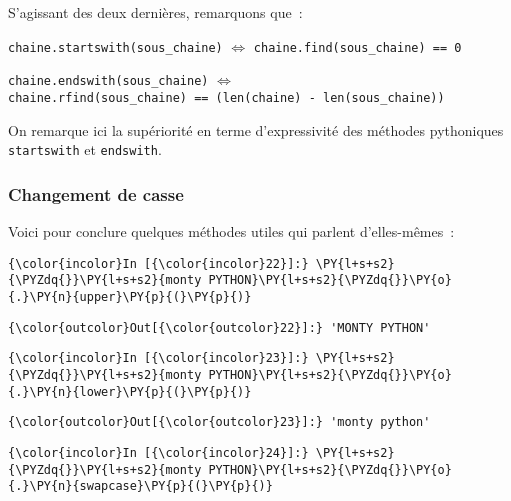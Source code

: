     S'agissant des deux dernières, remarquons que~:

    \texttt{chaine.startswith(sous\_chaine)} \(\Longleftrightarrow\)
\texttt{chaine.find(sous\_chaine)\ ==\ 0}

\texttt{chaine.endswith(sous\_chaine)} \(\Longleftrightarrow\)
\texttt{chaine.rfind(sous\_chaine)\ ==\ (len(chaine)\ -\ len(sous\_chaine))}

    On remarque ici la supériorité en terme d'expressivité des méthodes
pythoniques \texttt{startswith} et \texttt{endswith}.

    \hypertarget{changement-de-casse}{%
\subsubsection{Changement de casse}\label{changement-de-casse}}

    Voici pour conclure quelques méthodes utiles qui parlent d'elles-mêmes~:

    \begin{Verbatim}[commandchars=\\\{\},frame=single,framerule=0.3mm,rulecolor=\color{cellframecolor}]
{\color{incolor}In [{\color{incolor}22}]:} \PY{l+s+s2}{\PYZdq{}}\PY{l+s+s2}{monty PYTHON}\PY{l+s+s2}{\PYZdq{}}\PY{o}{.}\PY{n}{upper}\PY{p}{(}\PY{p}{)}
\end{Verbatim}


\begin{Verbatim}[commandchars=\\\{\},frame=single,framerule=0.3mm,rulecolor=\color{cellframecolor}]
{\color{outcolor}Out[{\color{outcolor}22}]:} 'MONTY PYTHON'
\end{Verbatim}
            
    \begin{Verbatim}[commandchars=\\\{\},frame=single,framerule=0.3mm,rulecolor=\color{cellframecolor}]
{\color{incolor}In [{\color{incolor}23}]:} \PY{l+s+s2}{\PYZdq{}}\PY{l+s+s2}{monty PYTHON}\PY{l+s+s2}{\PYZdq{}}\PY{o}{.}\PY{n}{lower}\PY{p}{(}\PY{p}{)}
\end{Verbatim}


\begin{Verbatim}[commandchars=\\\{\},frame=single,framerule=0.3mm,rulecolor=\color{cellframecolor}]
{\color{outcolor}Out[{\color{outcolor}23}]:} 'monty python'
\end{Verbatim}
            
    \begin{Verbatim}[commandchars=\\\{\},frame=single,framerule=0.3mm,rulecolor=\color{cellframecolor}]
{\color{incolor}In [{\color{incolor}24}]:} \PY{l+s+s2}{\PYZdq{}}\PY{l+s+s2}{monty PYTHON}\PY{l+s+s2}{\PYZdq{}}\PY{o}{.}\PY{n}{swapcase}\PY{p}{(}\PY{p}{)}
\end{Verbatim}


